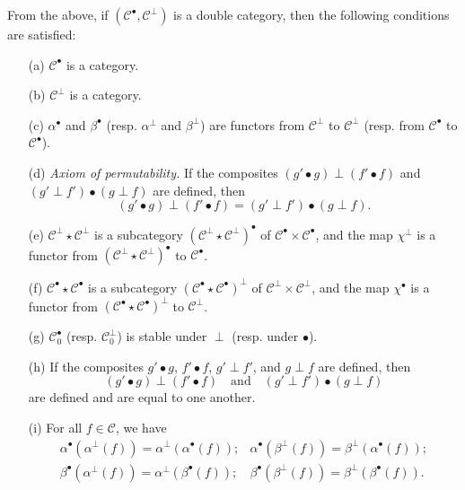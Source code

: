 \documentclass[a4paper,fleqn]{article}
\theoremstyle{plain}
\theoremstyle{definition}
\newcommand{\textand}{\quad\text{and}\quad}
\newcommand{\CC}{\mathcal{C}}
\newcommand{\smallbullet}{\bullet}
\begin{document}
From the above, if $(\CC^\smallbullet,\CC^\perp)$ is a double category, then the following conditions are satisfied:
\begin{enumerate}
  \item[\normalfont(a)]
    $\CC^\smallbullet$ is a category.
  \item[\normalfont(b)]
    $\CC^\perp$ is a category.
  \item[\normalfont(c)]
    $\alpha^\smallbullet$ and $\beta^\smallbullet$ (resp. $\alpha^\perp$ and $\beta^\perp$) are functors from $\CC^\perp$ to $\CC^\perp$ (resp. from $\CC^\smallbullet$ to $\CC^\smallbullet$).
  \item[\normalfont(d)]
    \emph{Axiom of permutability.}
    If the composites $(g'\smallbullet g)\perp(f'\smallbullet f)$ and $(g'\perp f')\smallbullet(g\perp f)$ are defined, then
    \[
      (g'\smallbullet g)\perp(f'\smallbullet f)
      = (g'\perp f')\smallbullet(g\perp f).
    \]
  \item[\normalfont(e)]
    $\CC^\perp\star\CC^\perp$ is a subcategory $(\CC^\perp\star\CC^\perp)^\smallbullet$ of $\CC^\smallbullet\times\CC^\smallbullet$, and the map $\chi^\perp$ is a functor from $(\CC^\perp\star\CC^\perp)^\smallbullet$ to $\CC^\smallbullet$.
  \item[\normalfont(f)]
    $\CC^\smallbullet\star\CC^\smallbullet$ is a subcategory $(\CC^\smallbullet\star\CC^\smallbullet)^\perp$ of $\CC^\perp\times\CC^\perp$, and the map $\chi^\smallbullet$ is a functor from $(\CC^\smallbullet\star\CC^\smallbullet)^\perp$ to $\CC^\perp$.
  \item[\normalfont(g)]
    $\CC_0^\smallbullet$ (resp. $\CC_0^\perp$) is stable under $\perp$ (resp. under $\smallbullet$).
  \item[\normalfont(h)]
    If the composites $g'\smallbullet g$, $f'\smallbullet f$, $g'\perp f'$, and $g\perp f$ are defined, then
    \[
      (g'\smallbullet g)\perp(f'\smallbullet f)
      \textand
      (g'\perp f')\smallbullet(g\perp f)
    \]
    are defined and are equal to one another.
  \item[\normalfont(i)]
    For all $f\in\CC$, we have
    \[
      \begin{array}{cc}
        \alpha^\smallbullet(\alpha^\perp(f))
        = \alpha^\perp(\alpha^\smallbullet(f));
        & \alpha^\smallbullet(\beta^\perp(f))
        = \beta^\perp(\alpha^\smallbullet(f));
      \\\beta^\smallbullet(\alpha^\perp(f))
        = \alpha^\perp(\beta^\smallbullet(f));
        & \beta^\smallbullet(\beta^\perp(f))
        = \beta^\perp(\beta^\smallbullet(f)).
      \end{array}
    \]
\end{enumerate}
\end{document}
